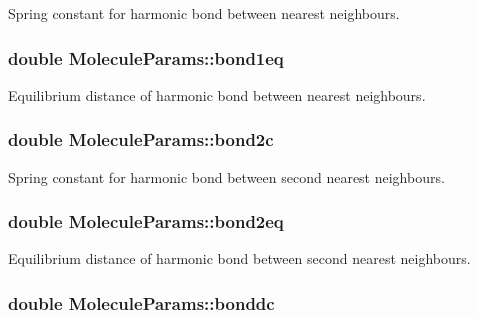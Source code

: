 Spring constant for harmonic bond between nearest neighbours. 

\hypertarget{class_molecule_params_af3ba3ec166a3d31ce27c707679dd7335}{
\subsubsection[{bond1eq}]{\setlength{\rightskip}{0pt plus 5cm}double Molecule\+Params\+::bond1eq}}\label{class_molecule_params_af3ba3ec166a3d31ce27c707679dd7335}


Equilibrium distance of harmonic bond between nearest neighbours. 

\hypertarget{class_molecule_params_a69fcc0cfc455c73f910b379860900a16}{
\subsubsection[{bond2c}]{\setlength{\rightskip}{0pt plus 5cm}double Molecule\+Params\+::bond2c}}\label{class_molecule_params_a69fcc0cfc455c73f910b379860900a16}


Spring constant for harmonic bond between second nearest neighbours. 

\hypertarget{class_molecule_params_a7ba670c7097cbef3dbbaaf995f726f7e}{
\subsubsection[{bond2eq}]{\setlength{\rightskip}{0pt plus 5cm}double Molecule\+Params\+::bond2eq}}\label{class_molecule_params_a7ba670c7097cbef3dbbaaf995f726f7e}


Equilibrium distance of harmonic bond between second nearest neighbours. 

\hypertarget{class_molecule_params_ae2c76f8dd300d5f70dbd905fea428e59}{
\subsubsection[{bonddc}]{\setlength{\rightskip}{0pt plus 5cm}double Molecule\+Params\+::bonddc}}\label{class_molecule_params_ae2c76f8dd300d5f70dbd905fea428e59}


